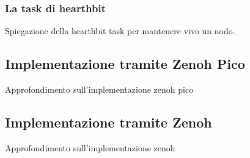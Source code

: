 \subsubsection{La task di hearthbit}
\label{sec:the-heartbeat-task}

Spiegazione della hearthbit task per mantenere vivo un nodo.

\subsection{Implementazione tramite Zenoh Pico}
\label{sec:zenoh-pico-implementation}

Approfondimento sull'implementazione zenoh pico

\subsection{Implementazione tramite Zenoh}
\label{sec:zenoh-implementation}

Approfondimento sull'implementazione zenoh
